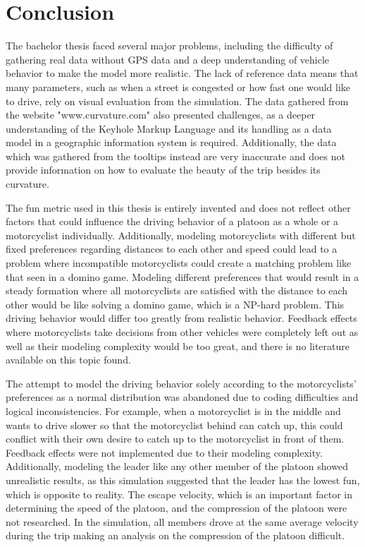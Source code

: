 \chapter{Conclusion}
\label{chaper:Conclusion}
The bachelor thesis faced several major problems, including the difficulty of gathering real data without GPS data and a deep understanding of vehicle behavior to make the model more realistic. The lack of reference data means that many parameters, such as when a street is congested or how fast one would like to drive, rely on visual evaluation from the simulation. The data gathered from the website "www.curvature.com" also presented challenges, as a deeper understanding of the Keyhole Markup Language and its handling as a data model in a geographic information system is required. Additionally, the data which was gathered from the tooltips instead are very inaccurate and does not provide information on how to evaluate the beauty of the trip besides its curvature. 

The fun metric used in this thesis is entirely invented and does not reflect other factors that could influence the driving behavior of a platoon as a whole or a motorcyclist individually. Additionally, modeling motorcyclists with different but fixed preferences regarding distances to each other and speed could lead to a problem where incompatible motorcyclists could create a matching problem like that seen in a domino game. Modeling different preferences that would result in a steady formation where all motorcyclists are satisfied with the distance to each other would be like solving a domino game, which is a NP-hard problem. This driving behavior would differ too greatly from realistic behavior. Feedback effects where motorcyclists take decisions from other vehicles were completely left out as well as their modeling complexity would be too great, and there is no literature available on this topic found.

The attempt to model the driving behavior solely according to the motorcyclists' preferences as a normal distribution was abandoned due to coding difficulties and logical inconsistencies. For example, when a motorcyclist is in the middle and wants to drive slower so that the motorcyclist behind can catch up, this could conflict with their own desire to catch up to the motorcyclist in front of them. Feedback effects were not implemented due to their modeling complexity. Additionally, modeling the leader like any other member of the platoon showed unrealistic results, as this simulation suggested that the leader has the lowest fun, which is opposite to reality. The escape velocity, which is an important factor in determining the speed of the platoon, and the compression of the platoon were not researched. In the simulation, all members drove at the same average velocity during the trip making an analysis on the compression of the platoon difficult. 

